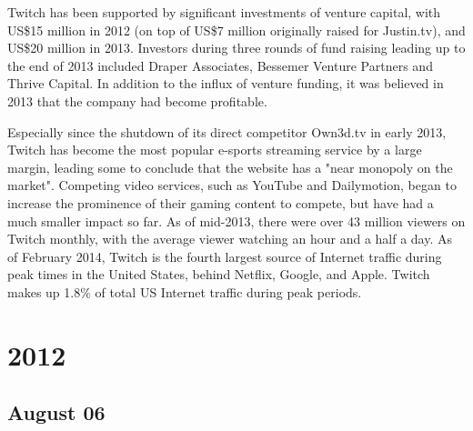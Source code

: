 \documentclass[11pt]{report}
\begin{document}
Twitch has been supported by significant investments of venture capital, with US\$15 million in 2012 (on top of US\$7 million originally raised for Justin.tv), and US\$20 million in 2013. Investors during three rounds of fund raising leading up to the end of 2013 included Draper Associates, Bessemer Venture Partners and Thrive Capital. In addition to the influx of venture funding, it was believed in 2013 that the company had become profitable.

Especially since the shutdown of its direct competitor Own3d.tv in early 2013, Twitch has become the most popular e-sports streaming service by a large margin, leading some to conclude that the website has a "near monopoly on the market". Competing video services, such as YouTube and Dailymotion, began to increase the prominence of their gaming content to compete, but have had a much smaller impact so far. As of mid-2013, there were over 43 million viewers on Twitch monthly, with the average viewer watching an hour and a half a day. As of February 2014, Twitch is the fourth largest source of Internet traffic during peak times in the United States, behind Netflix, Google, and Apple. Twitch makes up 1.8\% of total US Internet traffic during peak periods.

\chapter{2012}

\section{August 06}
\end{document}
